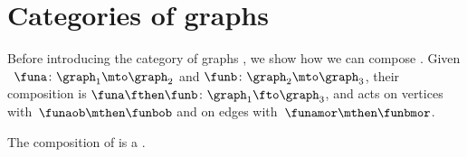 
\section[Categories of graphs]{Categories of graphs}
\label{sec:cat-grph}

Before introducing the category of graphs \Grph, we show how we can compose .
Given ~$\funa\colon \graph_1\mto \graph_2$ and $\funb\colon \graph_2\mto \graph_3$, their composition is $\funa\fthen \funb \colon \graph_1 \fto \graph_3$, and acts on vertices with~$\funaob \mthen \funbob$ and on edges with~$\funamor \mthen \funbmor$.

\begin{lemma}
    \label{lem:composing_homomorphisms}
    The composition of  is a .
\end{lemma}
%
